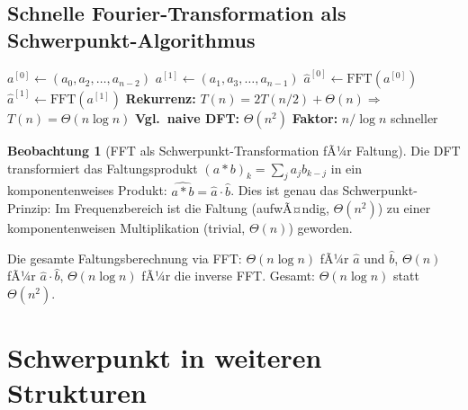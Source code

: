 ﻿\documentclass[a4paper,12pt]{report}
\theoremstyle{definition}
\newtheorem{beobachtung}{Beobachtung}
\begin{document}


\subsection*{Schnelle Fourier-Transformation als Schwerpunkt-Algorithmus}

\begin{algorithm}[H]
\DontPrintSemicolon
\caption{Schnelle Fourier-Transformation (Cooley-Tukey, $n = 2^k$)}\label{alg:fft}
$a^{[0]} \leftarrow (a_0, a_2, \ldots, a_{n-2})$ 
$a^{[1]} \leftarrow (a_1, a_3, \ldots, a_{n-1})$ 
$\hat{a}^{[0]} \leftarrow \mathrm{FFT}(a^{[0]})$\;
$\hat{a}^{[1]} \leftarrow \mathrm{FFT}(a^{[1]})$\;
\;
\BlankLine
\textbf{Rekurrenz:} $T(n) = 2T(n/2) + \Theta(n)$\quad $\Rightarrow$\quad $T(n) = \Theta(n\log n)$\;
\textbf{Vgl.\ naive DFT:} $\Theta(n^2)$ \quad \textbf{Faktor:} $n / \log n$ schneller
\end{algorithm}

\begin{beobachtung}[FFT als Schwerpunkt-Transformation fÃ¼r Faltung]
    Die DFT transformiert das Faltungsprodukt $(a * b)_k = \sum_j a_j b_{k-j}$
    in ein komponentenweises Produkt: $\widehat{a * b} = \hat{a} \cdot \hat{b}$.
    Dies ist genau das Schwerpunkt-Prinzip: Im Frequenzbereich ist die
    Faltung (aufwÃ¤ndig, $\Theta(n^2)$) zu einer komponentenweisen
    Multiplikation (trivial, $\Theta(n)$) geworden.

    Die gesamte Faltungsberechnung via FFT:
    $\Theta(n\log n)$ fÃ¼r $\hat{a}$ und $\hat{b}$, $\Theta(n)$ fÃ¼r $\hat{a}\cdot\hat{b}$,
    $\Theta(n\log n)$ fÃ¼r die inverse FFT. Gesamt: $\Theta(n\log n)$ statt $\Theta(n^2)$.
\end{beobachtung}

\section{Schwerpunkt in weiteren Strukturen}
\end{document}
